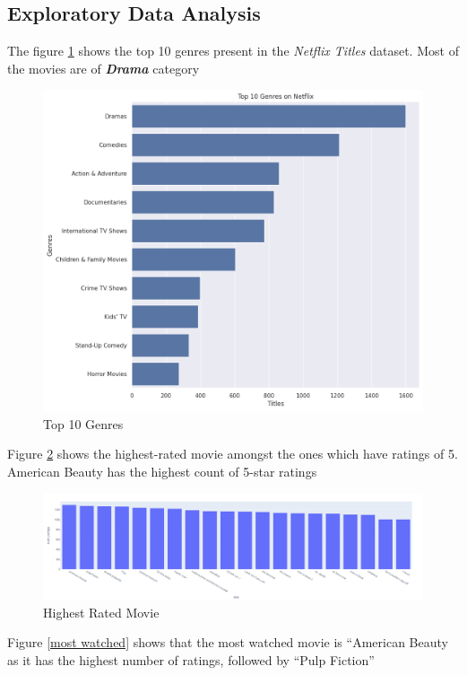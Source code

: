 \documentclass[a4paper,10pt]{article}
\begin{document}
\subsection{Exploratory Data Analysis}
The figure \ref{genre} shows the top 10 genres present in the \textit{Netflix Titles} dataset. Most of the movies are of \textbf{\textit{Drama}} category

\begin{figure}[H]
    \centering
    \includegraphics[width=12 cm]{genre.png}
    \caption{Top 10 Genres}
    \label{genre}
\end{figure}

\vspace{2pt}
Figure \ref{highest} shows the highest-rated movie amongst the ones which have ratings of 5. American Beauty has the highest count of 5-star ratings

\begin{figure} [H]
    \centering
    \includegraphics[width=15 cm]{highest_rated.png}
    \caption{Highest Rated Movie}
    \label{highest}
\end{figure}

Figure \ref{most watched} shows that the most watched movie is “American Beauty as it has the highest number of ratings, followed by “Pulp Fiction”
\end{document}

